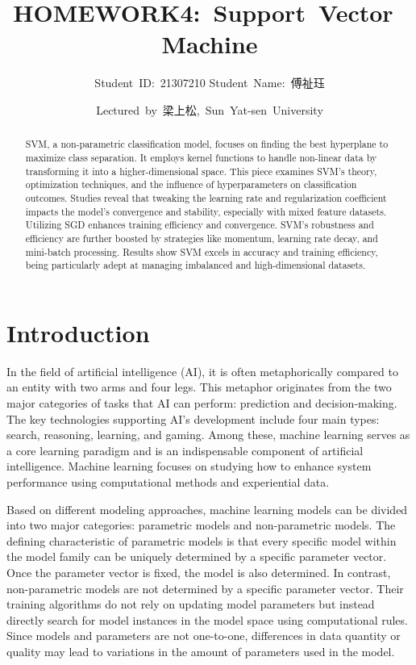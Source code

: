 \documentclass[a4paper, utf8]{ctexart}
\title{\songti \Large \textbf{HOMEWORK4:\ Support\ Vector\ Machine}}
\author{Student\ ID:\ 21307210 \qquad Student\ Name:\ 傅祉珏}
\date{Lectured\ by\ 梁上松,\ Sun\ Yat-sen\ University}
\begin{document}
	
	\maketitle
	
	\renewcommand{\abstractname}{\large \textbf{Abstract}}
	\begin{abstract}
		SVM, a non-parametric classification model, focuses on finding the best hyperplane to maximize class separation. It employs kernel functions to handle non-linear data by transforming it into a higher-dimensional space. This piece examines SVM's theory, optimization techniques, and the influence of hyperparameters on classification outcomes. Studies reveal that tweaking the learning rate and regularization coefficient impacts the model's convergence and stability, especially with mixed feature datasets. Utilizing SGD enhances training efficiency and convergence. SVM's robustness and efficiency are further boosted by strategies like momentum, learning rate decay, and mini-batch processing. Results show SVM excels in accuracy and training efficiency, being particularly adept at managing imbalanced and high-dimensional datasets.
		
	\end{abstract}
	
	\section{Introduction}
	
	In the field of artificial intelligence (AI), it is often metaphorically compared to an entity with two arms and four legs. This metaphor originates from the two major categories of tasks that AI can perform: prediction and decision-making. The key technologies supporting AI's development include four main types: search, reasoning, learning, and gaming. Among these, machine learning serves as a core learning paradigm and is an indispensable component of artificial intelligence. Machine learning focuses on studying how to enhance system performance using computational methods and experiential data.
	
	Based on different modeling approaches, machine learning models can be divided into two major categories: parametric models and non-parametric models. The defining characteristic of parametric models is that every specific model within the model family can be uniquely determined by a specific parameter vector. Once the parameter vector is fixed, the model is also determined. In contrast, non-parametric models are not determined by a specific parameter vector. Their training algorithms do not rely on updating model parameters but instead directly search for model instances in the model space using computational rules. Since models and parameters are not one-to-one, differences in data quantity or quality may lead to variations in the amount of parameters used in the model.
	
\end{document}
